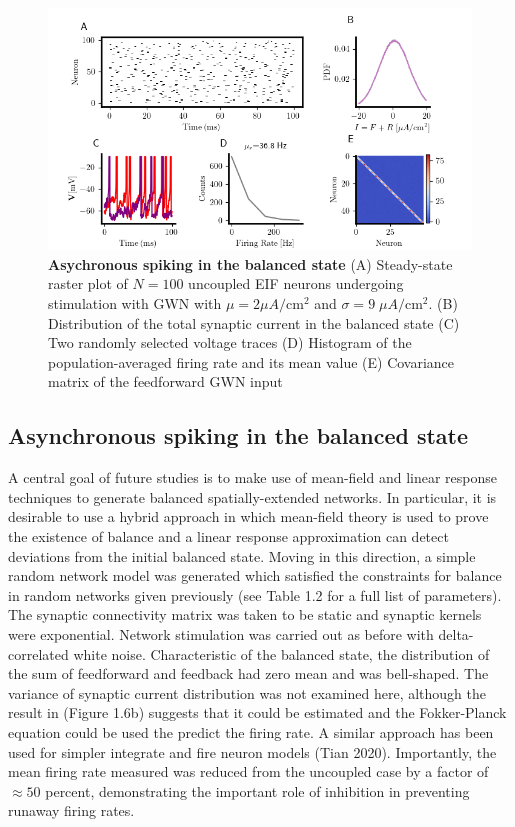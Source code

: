 \documentclass{ucetd}
\begin{document}
\begin{figure}[t!]
\centering
\includegraphics[width=175mm]{figure-11}
\caption{\textbf{Asychronous spiking in the balanced state} (A) Steady-state raster plot of $N=100$ uncoupled EIF neurons undergoing stimulation with GWN with $\mu = 2\mu A/\mathrm{cm}^{2}$ and $\sigma = 9 \;\mu A/\mathrm{cm}^{2}$. (B) Distribution of the total synaptic current in the balanced state (C) Two randomly selected voltage traces (D) Histogram of the population-averaged firing rate and its mean value (E) Covariance matrix of the feedforward GWN input}
\end{figure}


\subsection{Asynchronous spiking in the balanced state}

A central goal of future studies is to make use of mean-field and linear response techniques to generate balanced spatially-extended networks. In particular, it is desirable to use a hybrid approach in which mean-field theory is used to prove the existence of balance and a linear response approximation can detect deviations from the initial balanced state. Moving in this direction, a simple random network model was generated which satisfied the constraints for balance in random networks given previously (see Table 1.2 for a full list of parameters). The synaptic connectivity matrix was taken to be static and synaptic kernels were exponential.  Network stimulation was carried out as before with delta-correlated white noise. Characteristic of the balanced state, the distribution of the sum of feedforward and feedback had zero mean and was bell-shaped. The variance of synaptic current distribution was not examined here, although the result in (Figure 1.6b) suggests that it could be estimated and the Fokker-Planck equation could be used the predict the firing rate. A similar approach has been used for simpler integrate and fire neuron models (Tian 2020). Importantly, the mean firing rate measured was reduced from the uncoupled case by a factor of $\approx 50$ percent, demonstrating the important role of inhibition in preventing runaway firing rates. 
\end{document}
